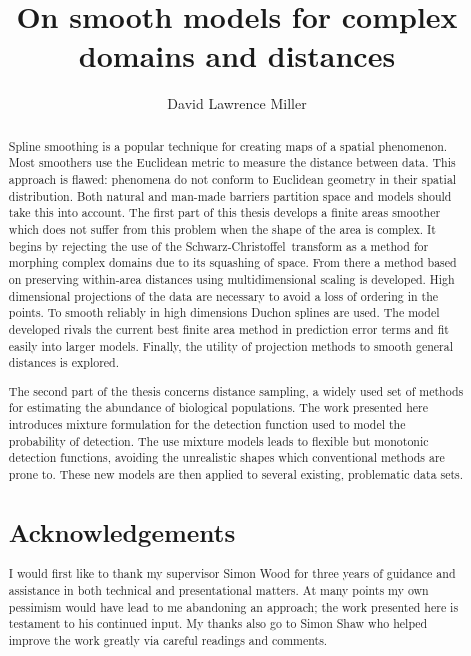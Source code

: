 \documentclass[12pt]{report}
\title{On smooth models for complex domains and distances}
\author{David Lawrence Miller}
\newcommand{\sch}{Schwarz-Christoffel}
\begin{document}
\maketitle

%



\begin{abstract} 
Spline smoothing is a popular technique for creating maps of a spatial phenomenon. Most smoothers use the Euclidean metric to measure the distance between data. This approach is flawed: phenomena do not conform to Euclidean geometry in their spatial distribution. Both natural and man-made barriers partition space and models should take this into account. The first part of this thesis develops a finite areas smoother which does not suffer from this problem when the shape of the area is complex. It begins by rejecting the use of the \sch\ transform as a method for morphing complex domains due to its squashing of space. From there a method based on preserving within-area distances using multidimensional scaling is developed. High dimensional projections of the data are necessary to avoid a loss of ordering in the points. To smooth reliably in high dimensions Duchon splines are used. The model developed rivals the current best finite area method in prediction error terms and fit easily into larger models. Finally, the utility of projection methods to smooth general distances is explored.

The second part of the thesis concerns distance sampling, a widely used set of methods for estimating the abundance of biological populations. The work presented here introduces mixture formulation for the detection function used to model the probability of detection. The use mixture models leads to flexible but monotonic detection functions, avoiding the unrealistic shapes which conventional methods are prone to. These new models are then applied to several existing, problematic data sets.

\newpage

\begin{center}
\section*{Acknowledgements}
\end{center}
I would first like to thank my supervisor Simon Wood for three years of guidance and assistance in both technical and presentational matters. At many points my own pessimism would have lead to me abandoning an approach; the work presented here is testament to his continued input.  My thanks also go to Simon Shaw who helped improve the work greatly via careful readings and comments.


\end{abstract}
\end{document}
